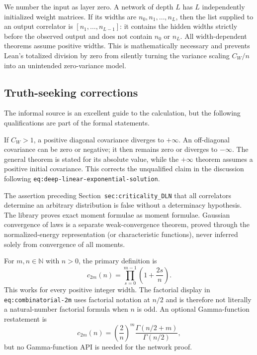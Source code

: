 We number the input as layer zero.  A network of depth $L$ has $L$ independently initialized
weight matrices.  If its widths are $n_0,n_1,\ldots,n_L$, then the list supplied to an output
correlator is $[n_1,\ldots,n_{L-1}]$: it contains the hidden widths strictly before the observed
output and does not contain $n_0$ or $n_L$.  All width-dependent theorems assume positive widths.
This is mathematically necessary and prevents Lean's totalized division by zero from silently
turning the variance scaling $C_W/n$ into an unintended zero-variance model.

\subsection{Truth-seeking corrections}

The informal source is an excellent guide to the calculation, but the following qualifications are
part of the formal statements.

\begin{remark}
If $C_W>1$, a positive diagonal covariance diverges to $+\infty$.  An off-diagonal covariance can
be zero or negative; it then remains zero or diverges to $-\infty$.  The general theorem is stated
for its absolute value, while the $+\infty$ theorem assumes a positive initial covariance.  This
corrects the unqualified claim in the discussion following
\texttt{eq:deep-linear-exponential-solution}.
\end{remark}

\begin{remark}
The assertion preceding Section~\texttt{sec:criticality\_DLN} that all correlators determine an
arbitrary distribution is false without a determinacy hypothesis.  The library proves exact moment
formulae as moment formulae.  Gaussian convergence of laws is a separate weak-convergence theorem,
proved through the normalized-energy representation (or characteristic functions), never inferred
solely from convergence of all moments.
\end{remark}

\begin{remark}
For $m,n\in\mathbb N$ with $n>0$, the primary definition is
\[
 c_{2m}(n)=\prod_{s=0}^{m-1}\left(1+\frac{2s}{n}\right).
\]
This works for every positive integer width.  The factorial display in
\texttt{eq:combinatorial-2m} uses factorial notation at $n/2$ and is therefore not literally a
natural-number factorial formula when $n$ is odd.  An optional Gamma-function restatement is
\[
 c_{2m}(n)=\left(\frac2n\right)^m
   \frac{\Gamma(n/2+m)}{\Gamma(n/2)},
\]
but no Gamma-function API is needed for the network proof.
\end{remark}

